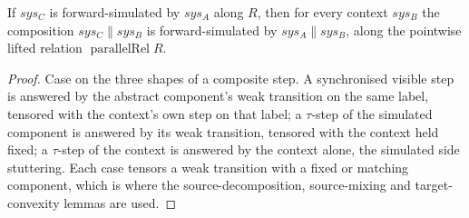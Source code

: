 \begin{theorem}
  \label{thm:precong-parallel}
  \leanok
  If $sys_C$ is forward-simulated by $sys_A$ along $R$, then for every context
  $sys_B$ the composition $sys_C \parallel sys_B$ is forward-simulated by
  $sys_A \parallel sys_B$, along the pointwise lifted relation
  $\operatorname{parallelRel} R$.
\end{theorem}

\begin{proof}\leanok
  Case on the three shapes of a composite step. A synchronised visible step is
  answered by the abstract component's weak transition on the same label,
  tensored with the context's own step on that label; a $\tau$-step of the
  simulated component is answered by its weak transition, tensored with the
  context held fixed; a $\tau$-step of the context is answered by the context
  alone, the simulated side stuttering. Each case tensors a weak transition
  with a fixed or matching component, which is where the source-decomposition,
  source-mixing and target-convexity lemmas are used.
\end{proof}
